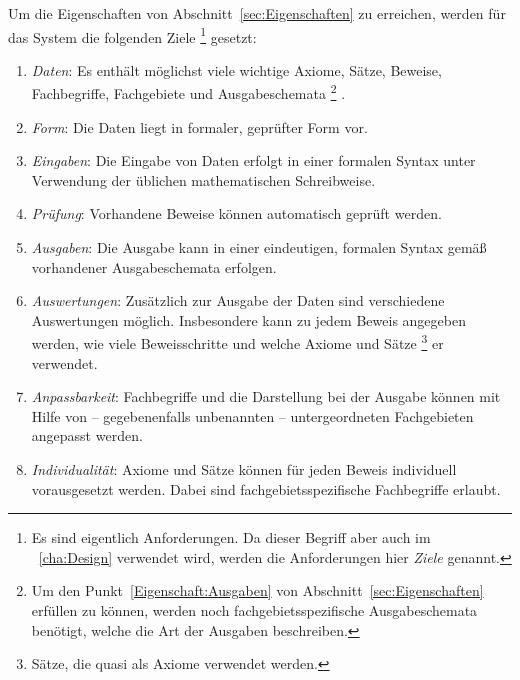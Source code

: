 \documentclass[english,ngerman,parskip=half,headsepline,footsepline]{scrreprt}
\newcommand*{\Idx}[1]{#1\idx{#1}}%
\newcommand*{\sectionname}{Abschnitt}
\begin{document}
	Um die Eigenschaften von \sectionname~\vref{sec:Eigenschaften} zu erreichen, werden für das System die folgenden Ziele%
	\footnote{%
		Es sind eigentlich Anforderungen.
		Da dieser Begriff aber auch im \chaptername~\vref{cha:Design} verwendet wird, werden die Anforderungen hier \emph{\Idx{Ziel}}\emph{e} genannt.
	}
	gesetzt:

	\begin{enumerate}

		\item \label{Ziel:Daten} \emph{Daten}: Es enthält möglichst viele wichtige Axiome, Sätze, Beweise, Fachbegriffe, Fachgebiete und Ausgabeschemata%
		\footnote{%
			Um den Punkt~\ref{Eigenschaft:Ausgaben} von \sectionname~\vref{sec:Eigenschaften} erfüllen zu können, werden noch fachgebietsspezifische Ausgabeschemata benötigt, welche die Art der Ausgaben beschreiben.
		}%
		.

		\item \label{Ziel:Form} \emph{Form}: Die Daten liegt in formaler, geprüfter Form vor.

		\item \label{Ziel:Eingaben} \emph{Eingaben}: Die Eingabe von Daten erfolgt in einer formalen Syntax unter Verwendung der üblichen mathematischen Schreibweise.

		\item \label{Ziel:Prüfung} \emph{Prüfung}: Vorhandene Beweise können automatisch geprüft werden.

		\item \label{Ziel:Ausgaben} \emph{Ausgaben}: Die Ausgabe kann in einer eindeutigen, formalen Syntax gemäß vorhandener Ausgabeschemata erfolgen.

		\item \label{Ziel:Auswertungen} \emph{Auswertungen}: Zusätzlich zur Ausgabe der Daten sind verschiedene Auswertungen möglich.
		Insbesondere kann zu jedem Beweis angegeben werden, wie viele Beweisschritte und welche Axiome und Sätze%
		\footnote{Sätze, die quasi als Axiome verwendet werden.}
		er verwendet.

		\item \label{Ziel:Anpassbarkeit} \emph{Anpassbarkeit}: Fachbegriffe und die Darstellung bei der Ausgabe können mit Hilfe von -- gegebenenfalls unbenannten -- untergeordneten Fachgebieten angepasst werden.

		\item \label{Ziel:Individualität} \emph{Individualität}: Axiome und Sätze können für jeden Beweis individuell vorausgesetzt werden.
		Dabei sind fachgebietsspezifische Fachbegriffe erlaubt.


\end{enumerate}
\end{document}
